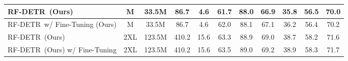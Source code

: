 \documentclass{article} %
\newcommand{\method}{RF-DETR}
\begin{document}
{\begin{table}[t]
{\begin{tabular}{|lcccccccccc|}
\multicolumn{1}{|l|}{\method \ (Ours)}     & \multicolumn{1}{c|}{M}     &   33.5M    &   86.7     & \multicolumn{1}{c|}{4.6}             & 61.7   &    88.0  &   66.9   &  35.8   &   56.5  &   70.0  \\ \hline 
\multicolumn{1}{|l|}{\method \ w/ Fine-Tuning (Ours)}     & \multicolumn{1}{c|}{M}     &   33.5M    &   86.7     & \multicolumn{1}{c|}{4.6}             & 62.0   &  88.1   &  67.1   &  36.2   &  56.4  &  70.2   \\ \hline
\multicolumn{1}{|l|}{\method \ (Ours)}     & \multicolumn{1}{c|}{2XL}     &  123.5M   &   410.2    & \multicolumn{1}{c|}{15.6}             &  63.3   &   88.9   &    69.0  &  38.7    &   58.2   &   71.6   \\ \hline
\multicolumn{1}{|l|}{\method \ (Ours) w/ Fine-Tuning}     & \multicolumn{1}{c|}{2XL}     &   123.5M   &   410.2     & \multicolumn{1}{c|}{15.6}             &  63.5  &   89.0   &  69.2    &  38.9   &  58.3   &  71.7   \\ \hline

\end{tabular}}
\end{table}}
\end{document}

